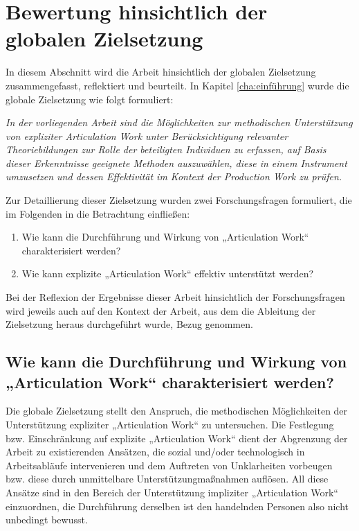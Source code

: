 \section{Bewertung hinsichtlich der globalen Zielsetzung}
\label{sec:bewertung_hinsichtlich_der_globalen_zielsetzung}

In diesem Abschnitt wird die Arbeit hinsichtlich der globalen Zielsetzung zusammengefasst, reflektiert und beurteilt. In Kapitel \ref{cha:einführung} wurde die globale Zielsetzung wie folgt formuliert:

\begin{framed}	
	\emph{In der vorliegenden Arbeit sind die Möglichkeiten zur methodischen Unterstützung von expliziter Articulation Work unter Berücksichtigung relevanter Theoriebildungen zur Rolle der beteiligten Individuen zu erfassen, auf Basis dieser Erkenntnisse geeignete Methoden auszuwählen, diese in einem Instrument umzusetzen und dessen Effektivität im Kontext der Production Work zu prüfen.}
\end{framed}


Zur Detaillierung dieser Zielsetzung wurden zwei Forschungsfragen formuliert, die im Folgenden in die Betrachtung einfließen:
\begin{enumerate}
	\item Wie kann die Durchführung und Wirkung von „Articulation Work“ charakterisiert werden?
	\item Wie kann explizite „Articulation Work“ effektiv unterstützt werden?
\end{enumerate}

Bei der Reflexion der Ergebnisse dieser Arbeit hinsichtlich der Forschungsfragen wird jeweils auch auf den Kontext der Arbeit, aus dem die Ableitung der Zielsetzung heraus durchgeführt wurde, Bezug genommen.

\subsection{Wie kann die Durchführung und Wirkung von „Articulation Work“ charakterisiert werden?}

Die globale Zielsetzung stellt den Anspruch, die methodischen  Möglichkeiten der Unterstützung expliziter „Articulation Work“ zu untersuchen. Die Festlegung bzw. Einschränkung auf explizite „Articulation Work“ dient der Abgrenzung der Arbeit zu existierenden Ansätzen, die sozial und/oder technologisch in Arbeitsabläufe intervenieren und dem Auftreten von Unklarheiten vorbeugen bzw. diese durch unmittelbare Unterstützungmaßnahmen auflösen. All diese Ansätze sind in den Bereich der Unterstützung impliziter „Articulation Work“ einzuordnen, die Durchführung derselben ist den handelnden Personen also nicht unbedingt bewusst. 

